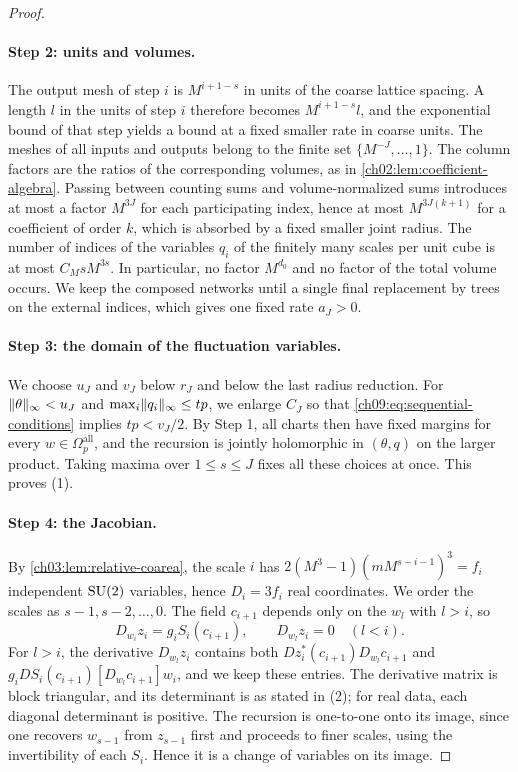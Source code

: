 \begin{proof}
\paragraph{Step 2: units and volumes.}
The output mesh of step $i$ is $M^{i+1-s}$ in units of the coarse lattice spacing. A length $l$ in the units of step $i$ therefore becomes $M^{i+1-s}l$, and the exponential bound of that step yields a bound at a fixed smaller rate in coarse units. The meshes of all inputs and outputs belong to the finite set $\{M^{-J},\ldots,1\}$. The column factors are the ratios of the corresponding volumes, as in \cref{ch02:lem:coefficient-algebra}. Passing between counting sums and volume-normalized sums introduces at most a factor $M^{3J}$ for each participating index, hence at most $M^{3J(k+1)}$ for a coefficient of order $k$, which is absorbed by a fixed smaller joint radius. The number of indices of the variables $q_i$ of the finitely many scales per unit cube is at most $C_MsM^{3s}$. In particular, no factor $M^{d_0}$ and no factor of the total volume occurs. We keep the composed networks until a single final replacement by trees on the external indices, which gives one fixed rate $a_J>0$.

\paragraph{Step 3: the domain of the fluctuation variables.}
We choose $u_J$ and $v_J$ below $r_J$ and below the last radius reduction. For $\lVert \theta\rVert_\infty<u_J$ and $\max_i\lVert q_i\rVert_\infty\le tp$, we enlarge $C_J$ so that \eqref{ch09:eq:sequential-conditions} implies $tp<v_J/2$. By Step 1, all charts then have fixed margins for every $w\in\Omega_p^{\mathrm{all}}$, and the recursion is jointly holomorphic in $(\theta,q)$ on the larger product. Taking maxima over $1\le s\le J$ fixes all these choices at once. This proves (1).

\paragraph{Step 4: the Jacobian.}
By \cref{ch03:lem:relative-coarea}, the scale $i$ has $2(M^3-1)(mM^{s-i-1})^3=f_i$ independent $\mathrm{SU}(2)$ variables, hence $D_i=3f_i$ real coordinates. We order the scales as $s-1,s-2,\ldots,0$. The field $c_{i+1}$ depends only on the $w_l$ with $l>i$, so
\[
 D_{w_i}z_i=g_iS_i(c_{i+1}),\qquad D_{w_l}z_i=0\quad(l<i).
\]
For $l>i$, the derivative $D_{w_l}z_i$ contains both $Dz_i^*(c_{i+1})D_{w_l}c_{i+1}$ and $g_iDS_i(c_{i+1})[D_{w_l}c_{i+1}]w_i$, and we keep these entries. The derivative matrix is block triangular, and its determinant is as stated in (2); for real data, each diagonal determinant is positive. The recursion is one-to-one onto its image, since one recovers $w_{s-1}$ from $z_{s-1}$ first and proceeds to finer scales, using the invertibility of each $S_i$. Hence it is a change of variables on its image.


\end{proof}
